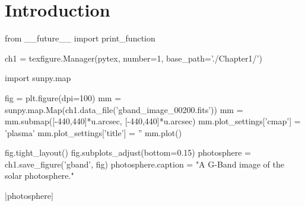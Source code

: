 \label{ch:Intro}
\chapter{Introduction}  %

\begin{pycode}[chapter1]
from __future__ import print_function

ch1 = texfigure.Manager(pytex, number=1, base_path='./Chapter1/')
\end{pycode}

\begin{pycode}[chapter1]
import sunpy.map

fig = plt.figure(dpi=100)
mm = sunpy.map.Map(ch1.data_file('gband_image_00200.fits'))
mm = mm.submap([-440,440]*u.arcsec, [-440,440]*u.arcsec)
mm.plot_settings['cmap'] = 'plasma'
mm.plot_settings['title'] = ''
mm.plot()

fig.tight_layout()
fig.subplots_adjust(bottom=0.15)
photosphere = ch1.save_figure('gband', fig)
photosphere.caption = "A G-Band image of the solar photosphere."
\end{pycode}

\py[chapter1]|photosphere|